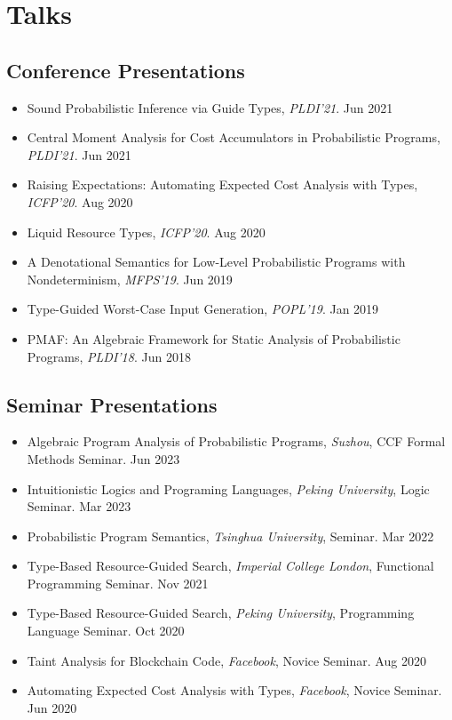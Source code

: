 \documentclass[11pt,letterpaper,roman]{moderncv}        %
\begin{document}
\section{Talks}

\subsection{Conference Presentations}

\begin{itemize}
  \item {Sound Probabilistic Inference via Guide Types}, \emph{PLDI'21}. \hfill Jun 2021
  \item {Central Moment Analysis for Cost Accumulators in Probabilistic Programs}, \emph{PLDI'21}. \hfill Jun 2021
  \item {Raising Expectations: Automating Expected Cost Analysis with Types}, \emph{ICFP'20}. \hfill Aug 2020
  \item {Liquid Resource Types}, \emph{ICFP'20}. \hfill Aug 2020
  \item {A Denotational Semantics for Low-Level Probabilistic Programs with Nondeterminism}, \emph{MFPS'19}. \hfill Jun 2019
  \item {Type-Guided Worst-Case Input Generation}, \emph{POPL'19}. \hfill Jan 2019
  \item {PMAF: An Algebraic Framework for Static Analysis of Probabilistic Programs}, \emph{PLDI'18}. \hfill Jun 2018
\end{itemize}

\subsection{Seminar Presentations}

\begin{itemize}
  \item {Algebraic Program Analysis of Probabilistic Programs}, \emph{Suzhou}, CCF Formal Methods Seminar. \hfill Jun 2023
  \item {Intuitionistic Logics and Programing Languages}, \emph{Peking University}, Logic Seminar. \hfill Mar 2023
  \item {Probabilistic Program Semantics}, \emph{Tsinghua University}, Seminar. \hfill Mar 2022
  \item {Type-Based Resource-Guided Search}, \emph{Imperial College London}, Functional Programming Seminar. \hfill Nov 2021
  \item {Type-Based Resource-Guided Search}, \emph{Peking University}, Programming Language Seminar. \hfill Oct 2020
  \item {Taint Analysis for Blockchain Code}, \emph{Facebook}, Novice Seminar. \hfill Aug 2020
  \item {Automating Expected Cost Analysis with Types}, \emph{Facebook}, Novice Seminar. \hfill Jun 2020
\end{itemize}
\end{document}
